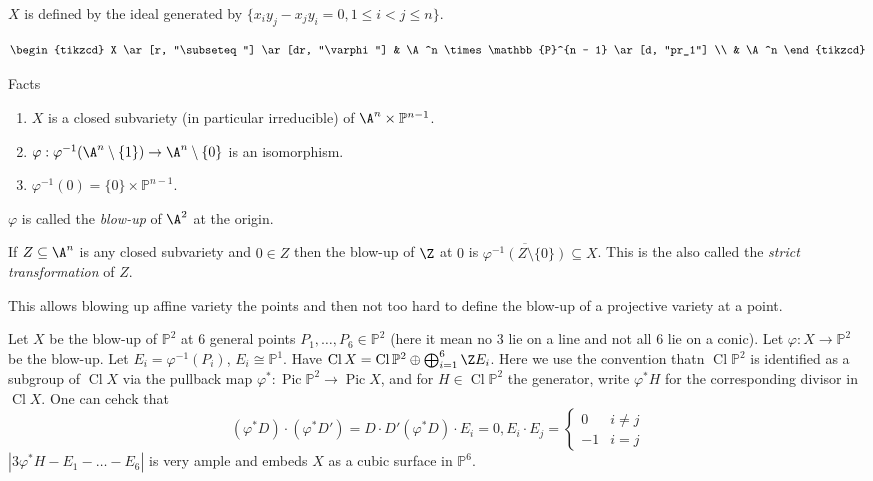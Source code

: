 \documentclass[a4paper]{article}
\renewcommand*{\P}{\mathbb{P}}
\DeclareMathOperator{\Pic}{Pic} %
\DeclareMathOperator{\Cl}{Cl} %
\begin{document}
\(X\) is defined by the ideal generated by \(\{x_iy_j - x_j y_i = 0, 1 \leq i < j \leq n\}\).

\[
  \begin{tikzcd}
    X \ar[r, "\subseteq"] \ar[dr, "\varphi"] & \A^n \times \P^{n - 1} \ar[d, "pr_1"] \\
    & \A^n
  \end{tikzcd}
\]

Facts
\begin{enumerate}
\item \(X\) is a closed subvariety (in particular irreducible) of \(\A^n \times \P^{n - 1}\).
\item \(\varphi: \varphi^{-1}(\A^n \setminus \{1\}) \to \A^n \setminus \{0\}\) is an isomorphism.
\item \(\varphi^{-1}(0) = \{0\} \times \P^{n - 1}\).
\end{enumerate}
\(\varphi\) is called the \emph{blow-up} of \(\A^2\) at the origin.

If \(Z \subseteq \A^n\) is any closed subvariety and \(0 \in Z\) then the blow-up of \(\Z\) at \(0\) is \(\overline{\varphi^{-1}(Z \setminus \{0\})} \subseteq X\). This is the also called the \emph{strict transformation} of \(Z\).

This allows blowing up affine variety the points and then not too hard to define the blow-up of a projective variety at a point.

\begin{eg}
  Let \(X\) be the blow-up of \(\P^2\) at \(6\) general points \(P_1, \dots, P_6 \in \P^2\) (here it mean no \(3\) lie on a line and not all \(6\) lie on a conic). Let \(\varphi: X \to \P^2\) be the blow-up. Let \(E_i = \varphi^{-1}(P_i)\), \(E_i \cong \P^1\). Have \(\Cl X = \Cl \P^2 \oplus \bigoplus_{i = 1}^6 \Z E_i\). Here we use the convention thatn \(\Cl \P^2\) is identified as a subgroup of \(\Cl X\) via the pullback map \(\varphi^*: \Pic \P^2 \to \Pic X\), and for \(H \in \Cl \P^2\) the generator, write \(\varphi^*H\) for the corresponding divisor in \(\Cl X\). One can cehck that
  \[
    (\varphi^* D) \cdot (\varphi^* D') = D \cdot D'
    (\varphi^* D) \cdot E_i = 0,
    E_i \cdot E_j =
    \begin{cases}
      0 & i \ne j \\
      -1 & i = j
    \end{cases}
  \]
  \(|3 \varphi^* H - E_1 - \dots - E_6|\) is very ample and embeds \(X\) as a cubic surface in \(\P^6\).
\end{eg}


\printindex
\end{document}
